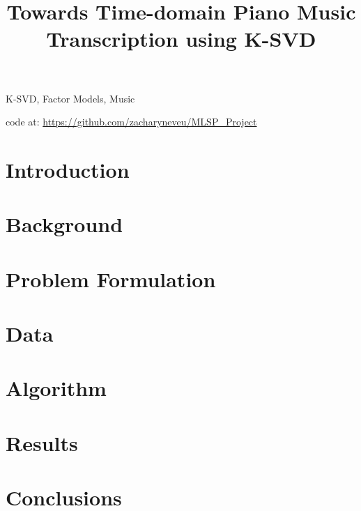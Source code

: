 \documentclass{article}
\title{Towards Time-domain Piano Music Transcription using K-SVD}
\begin{document}
%

\maketitle
%
\begin{abstract}

\end{abstract}
%
\begin{keywords}
K-SVD, Factor Models, Music
\end{keywords}

code at: \href{https://github.com/zacharyneveu/MLSP\_Project}{https://github.com/zacharyneveu/MLSP\_Project}
%
\section{Introduction}
\label{sec:intro}


\section{Background}%
\label{sec:background}


\section{Problem Formulation}%
\label{sec:problem_formulation}


\section{Data}%
\label{sec:data}



\section{Algorithm}%
\label{sec:algorithm}


\section{Results}%
\label{sec:results}


\section{Conclusions}%
\label{sec:conclusions}





\end{document}
